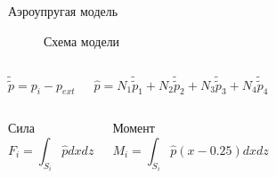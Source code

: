 \documentclass[ignoreonframetext,unicode]{beamer}
\begin{document}
\begin{frame}{Аэроупругая модель}
	\vspace*{-9mm}
	\begin{figure}[!htbp]
		\caption{Схема модели}
		\label{pruzina}
	\end{figure}	

\vspace*{-5mm}
	\begin{columns}
		\begin{block}{}
			\begin{equation*}
				\tilde{\tilde{p}} = p_i - p_{ext}
			\end{equation*}
		\end{block}
		\begin{block}{}
			\vspace*{2mm}
			\begin{equation*}
			 \hat{p}	= N_1 \tilde{\tilde{p}}_1 + N_2 \tilde{\tilde{p}}_2 + N_3 \tilde{\tilde{p}}_3 + N_4 \tilde{\tilde{p}}_4
			\end{equation*}
		\end{block}
	\end{columns}
	
	\vspace*{-2mm}
		\begin{columns}	
				\column{0.5\textwidth}
	\begin{block}{Сила}
		\begin{equation*}
			F_i = \int_{S_i} { \hat{p}   dx dz}
		\end{equation*}
	\end{block}
	\column{0.5\textwidth}
	\begin{block}{Момент}
		\begin{equation*}
			M_i = \int_{S_i} {\hat{p}  \left(x - 0.25 \right)  dx dz}
		\end{equation*}
	\end{block}
\end{columns}


	
\end{frame}
\end{document}
